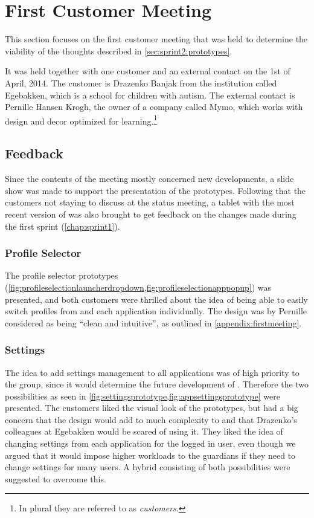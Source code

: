 \section{First Customer Meeting}\label{sec:sprint2:firstmeeting}
This section focuses on the first customer meeting that was held to determine the viability of the thoughts described in \cref{sec:sprint2:prototypes}.

It was held together with one customer and an external contact on the 1st of April, 2014.
The customer is Drazenko Banjak from the institution called Egebakken, which is a school for children with autism.
The external contact is Pernille Hansen Krogh, the owner of a company called Mymo, which works with design and decor optimized for learning.\footnote{In plural they are referred to as \textit{customers}.}


\subsection{Feedback}
Since the contents of the meeting mostly concerned new developments, a slide show was made to support the presentation of the prototypes.
Following that the customers not staying to discuss \giraf at the status meeting, a tablet with the most recent version of \launcher was also brought to get feedback on the changes made during the first sprint (\cref{chap:sprint1}).


\subsubsection{Profile Selector}
The profile selector prototypes (\cref{fig:profileselectionlauncherdropdown,fig:profileselectionapppopup}) was presented, and both customers were thrilled about the idea of being able to easily switch profiles from \launcher and each \giraf application individually.
The design was by Pernille considered as being ``clean and intuitive'', as outlined in \cref{appendix:firstmeeting}.


\subsubsection{Settings}
The idea to add settings management to all \giraf applications was of high priority to the group, since it would determine the future development of \launcher.
Therefore the two possibilities as seen in \cref{fig:settingsprototype,fig:appsettingsprototype} were presented.
The customers liked the visual look of the prototypes, but had a big concern that the design would add to much complexity to \launcher and that Drazenko's colleagues at Egebakken would be scared of using it.
They liked the idea of changing settings from each application for the logged in user, even though we argued that it would impose higher workloads to the guardians if they need to change settings for many users.
A hybrid consisting of both possibilities were suggested to overcome this.

